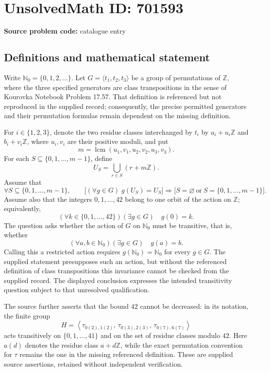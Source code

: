 \documentclass[11pt]{article}
\begin{document}
\section*{UnsolvedMath ID: 701593}
\textbf{Source problem code:} catalogue entry
\subsection{Definitions and mathematical statement}
Write \(\mathbb{N}_0=\{0,1,2,\ldots\}\). Let \(G=\langle t_1,t_2,t_3\rangle\) be a group of permutations of \(\mathbb{Z}\), where the three specified generators are class transpositions in the sense of Kourovka Notebook Problem 17.57. That definition is referenced but not reproduced in the supplied record; consequently, the precise permitted generators and their permutation formulas remain dependent on the missing definition.

For \(i\in\{1,2,3\}\), denote the two residue classes interchanged by \(t_i\) by \(a_i+u_i\mathbb{Z}\) and \(b_i+v_i\mathbb{Z}\), where \(u_i,v_i\) are their positive moduli, and put
\[
 m=\operatorname{lcm}(u_1,v_1,u_2,v_2,u_3,v_3).
\]
For each \(S\subseteq\{0,1,\ldots,m-1\}\), define
\[
 U_S=\bigcup_{r\in S}(r+m\mathbb{Z}).
\]
Assume that
\[
 \forall S\subseteq\{0,1,\ldots,m-1\},\qquad
 \bigl[(\forall g\in G)\;g(U_S)=U_S\bigr]
 \Longrightarrow
 \bigl[S=\varnothing\ \text{or}\ S=\{0,1,\ldots,m-1\}\bigr].
\]
Assume also that the integers \(0,1,\ldots,42\) belong to one orbit of the action on \(\mathbb{Z}\); equivalently,
\[
 (\forall k\in\{0,1,\ldots,42\})(\exists g\in G)\quad g(0)=k.
\]
The question asks whether the action of \(G\) on \(\mathbb{N}_0\) must be transitive, that is, whether
\[
 (\forall a,b\in\mathbb{N}_0)(\exists g\in G)\quad g(a)=b.
\]
Calling this a restricted action requires \(g(\mathbb{N}_0)=\mathbb{N}_0\) for every \(g\in G\). The supplied statement presupposes such an action, but without the referenced definition of class transpositions this invariance cannot be checked from the supplied record. The displayed conclusion expresses the intended transitivity question subject to that unresolved qualification.

The source further asserts that the bound \(42\) cannot be decreased: in its notation, the finite group
\[
 H=\left\langle
 \tau_{0(2),1(2)},\,
 \tau_{0(3),2(3)},\,
 \tau_{0(7),6(7)}
 \right\rangle
\]
acts transitively on \(\{0,1,\ldots,41\}\) and on the set of residue classes modulo \(42\). Here \(a(d)\) denotes the residue class \(a+d\mathbb{Z}\), while the exact permutation convention for \(\tau\) remains the one in the missing referenced definition. These are supplied source assertions, retained without independent verification.
\end{document}
